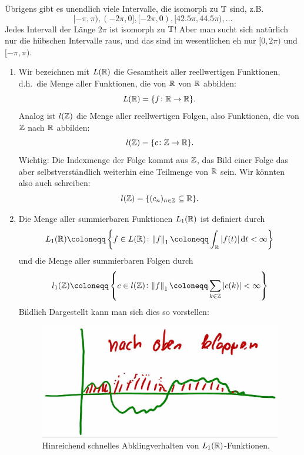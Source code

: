 \begin{remark}[Torus]
Übrigens gibt es unendlich viele Intervalle, die isomorph zu $ \mathbb{T} $ sind, z.B.
\[
  [-\pi, \pi), (-2\pi, 0], [-2\pi, 0), [42.5\pi, 44.5\pi), \dots
\]
Jedes Intervall der Länge $ 2\pi $ ist isomorph zu $ \mathbb{T} $! Aber man sucht sich natürlich nur die
hübschen Intervalle raus, und das sind im wesentlichen eh nur $ [0, 2\pi) $ und $ [-\pi, \pi) $.
\end{remark}

\begin{definition}[Funktionenräume] \leavevmode
\begin{enumerate}
\item Wir bezeichnen mit $ L(\mathbb{R}) $ die Gesamtheit aller reellwertigen Funktionen, d.h.\ die Menge 
  aller Funktionen, die von $ \mathbb{R} $ von $ \mathbb{R} $ abbilden:
  \[
    L(\mathbb{R}) = \{ f \colon \mathbb{R} \rightarrow \mathbb{R} \}.
  \]
  Analog ist $ l(\mathbb{Z}) $ die Menge aller reellwertigen Folgen, also Funktionen, die von $ \mathbb{Z} $ nach
  $ \mathbb{R} $ abbilden:
  \[
    l(\mathbb{Z}) = \{ c \colon \mathbb{Z} \rightarrow \mathbb{R} \}.
  \]
  Wichtig: Die Indexmenge der Folge kommt aus $ \mathbb{Z} $, das Bild einer Folge das aber 
  selbstverständlich weiterhin eine Teilmenge von $ \mathbb{R} $ sein. Wir könnten also auch schreiben:
  \[
    l(\mathbb{Z}) = \{ (c_{n})_{n \in \mathbb{Z}} \subseteq \mathbb{R} \}.
  \]
\item Die Menge aller summierbaren Funktionen $ L_{1}(\mathbb{R}) $ ist definiert durch
\[ 
  L_{1}(\R) \coloneqq \left\{
    f \in L(\R) \colon \norm{f}_{1} \coloneqq \int_{\R} |f(t)| \dif t < \infty
  \right\}
\]
und die Menge aller summierbaren Folgen durch
\[ 
  l_{1}(\Z) \coloneqq \left\{
    c \in l(\Z) \colon \norm{f}_{1} \coloneqq \sum_{k \in \Z} |c(k)| < \infty
  \right\}
\]
Bildlich Dargestellt kann man sich dies so vorstellen:
\begin{figure}[h]
\centering
\includegraphics[width=0.5\linewidth]{Bilder/L1}
\caption{Hinreichend schnelles Abklingverhalten von $ L_{1}(\mathbb{R}) $-Funktionen.}
\label{fig:L1}
\end{figure}





\end{enumerate}
\end{definition}
